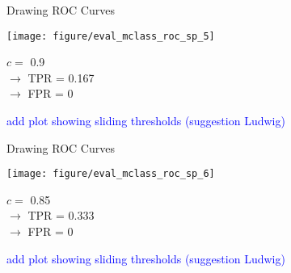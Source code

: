 \documentclass[11pt,compress,t,notes=noshow, xcolor=table]{beamer}
\newenvironment{knitrout}{}{} %
\begin{document}
\begin{vbframe}{Drawing ROC Curves}


\begin{knitrout}\scriptsize
{}\color{fgcolor}

{
\texttt{[image: figure/eval\_mclass\_roc\_sp\_5]} 
}

\end{knitrout}

\vfill

\begin{minipage}[b]{0.3\textwidth}
  $c =$ 0.9\\ 
  $\rightarrow$ TPR = 0.167 \\
  $\rightarrow$ FPR = 0
\end{minipage}%
\begin{minipage}[b]{0.7\textwidth}
  \textcolor{blue}{add plot showing sliding thresholds (suggestion Ludwig)}
\end{minipage}

\end{vbframe}


\begin{vbframe}{Drawing ROC Curves}

\begin{knitrout}\scriptsize
{}\color{fgcolor}

{
\texttt{[image: figure/eval\_mclass\_roc\_sp\_6]}
}

\end{knitrout}

\vfill

\begin{minipage}[b]{0.3\textwidth}
  $c =$ 0.85\\ 
  $\rightarrow$ TPR = 0.333 \\
  $\rightarrow$ FPR = 0
\end{minipage}%
\begin{minipage}[b]{0.7\textwidth}
  \textcolor{blue}{add plot showing sliding thresholds (suggestion Ludwig)}
\end{minipage}

\end{vbframe}
\end{document}
